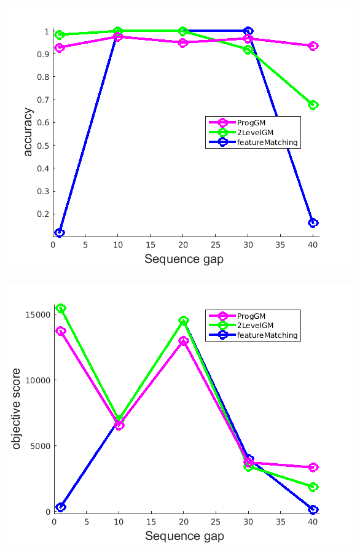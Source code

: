 \documentclass[
	fontsize=12pt,
	paper=a4,
	twoside=false,
	numbers=noenddot,
	plainheadsepline,
	toc=listof,
	toc=bibliography
]{scrartcl}
\begin{document}
\begin{figure}[h] 
	\begin{subfigure}[b]{0.3\textwidth}
		\centering
		\includegraphics[scale=0.25]{"fig_ver2608/RealImages/ImgTrafo/anchor_descr/using_cpd_afftrafo/performance/accuracy"}  
	\end{subfigure}%
	\begin{subfigure}[b]{0.3\textwidth}
		\centering
		\includegraphics[scale=0.25]{"fig_ver2608/RealImages/ImgTrafo/anchor_descr/using_cpd_afftrafo/performance/score"}  
	\end{subfigure} 
	\begin{subfigure}[b]{0.3\textwidth}
		\centering

\end{subfigure}
\end{figure}
\end{document}
